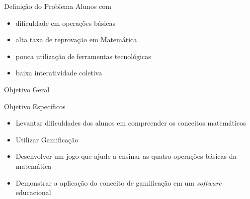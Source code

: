 \documentclass[13pt,xcolor=table]{beamer}
\begin{document}

\begin{frame} %
	\cabecalho
\end{frame}



\begin{frame}
	\begin{lamina}{Definição do Problema}
		Alunos com
		\begin{itemize}
			\item dificuldade em operações básicas
			\item alta taxa de reprovação em Matemática
			\item pouca utilização de ferramentas tecnológicas
			\item baixa interatividade coletiva
		\end{itemize}
	\end{lamina}
\end{frame}


\begin{frame}
	\begin{lamina}{Objetivo Geral}
		\vspace{3em}
		\begin{center}
		\end{center}
	\end{lamina}
\end{frame}


\begin{frame}
	\begin{lamina}{Objetivo Específicos}
		\begin{itemize}
			\item Levantar dificuldades dos alunos em compreender os conceitos matemáticos
			\item Utilizar Gamificação
			\item Desenvolver um jogo que ajude a ensinar as quatro operações básicas da matemática
			\item Demonstrar a aplicação do conceito de gamificação em um {\it software} educacional
		\end{itemize}
	\end{lamina}
\end{frame}
\end{document}
